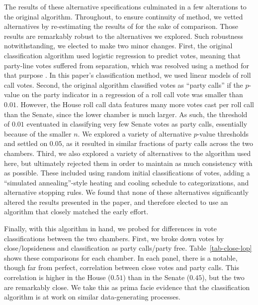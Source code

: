 \documentclass[12pt]{article}
\begin{document}
The results of these alternative specifications culminated in a few alterations to the original algorithm.  Throughout, to ensure continuity of method, we vetted alternatives by re-estimating the results of \citep{Minozzi:2013} for the sake of comparison.  Those results are remarkably robust to the alternatives we explored.  Such robustness notwithstanding, we elected to make two minor changes.  First, the original classification algorithm used logistic regression to predict votes, meaning that party-line votes suffered from separation, which was resolved using a method for that purpose \citep{Zorn:2005}.  In this paper's classification method, we used linear models of roll call votes.  Second, the original algorithm classified votes as ``party calls'' if the $p$-value on the party indicator in a regression of a roll call vote was smaller than $0.01$.  However, the House roll call data features many more votes cast per roll call than the Senate, since the lower chamber is much larger.  As such, the threshold of $0.01$ eventuated in classifying very few Senate votes as party calls, essentially because of the smaller $n$.  We explored a variety of alternative $p$-value thresholds and settled on $0.05$, as it resulted in similar fractions of party calls across the two chambers.  Third, we also explored a variety of alternatives to the algorithm used here, but ultimately rejected them in order to maintain as much consistency with \citep{Minozzi:2013} as possible.  These included using random initial classifications of votes, adding a ``simulated annealing''-style heating and cooling schedule to categorizations, and alternative stopping rules.  We found that none of these alternatives significantly altered the results presented in the paper, and therefore elected to use an algorithm that closely matched the early effort.

Finally, with this algorithm in hand, we probed for differences in vote classifications between the two chambers.  First, we broke down votes by close/lopsideness and classification as party calls/party free.  Table~\ref{tab-close-lop} shows these comparisons for each chamber. In each panel, there is a notable, though far from perfect, correlation between close votes and party calls.  This correlation is higher in the House ($0.51$) than in the Senate ($0.45$), but the two are remarkably close.  We take this as prima facie evidence that the classification algorithm is at work on similar data-generating processes.
\end{document}

